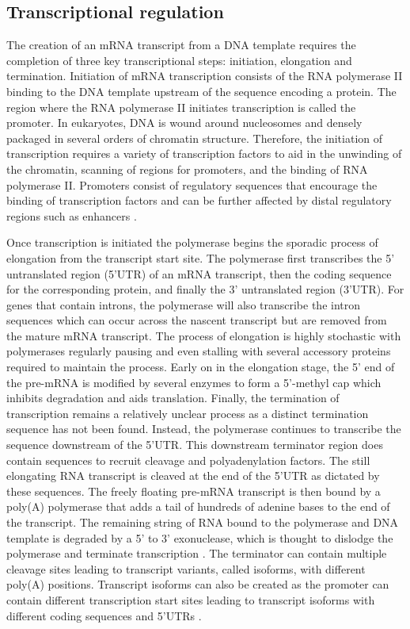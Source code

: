 \documentclass[../main.tex]{subfiles}
\begin{document}
\subsection{Transcriptional regulation}

The creation of an mRNA transcript from a DNA template requires the completion of three key transcriptional steps: initiation, elongation and termination.
Initiation of mRNA transcription consists of the RNA polymerase II binding to the DNA template upstream of the sequence encoding a protein.
The region where the RNA polymerase II initiates transcription is called the promoter.
In eukaryotes, DNA is wound around nucleosomes and densely packaged in several orders of chromatin structure.
Therefore, the initiation of transcription requires a variety of transcription factors to aid in the unwinding of the chromatin, scanning of regions for promoters, and the binding of RNA polymerase II.
Promoters consist of regulatory sequences that encourage the binding of transcription factors and can be further affected by distal regulatory regions such as enhancers \parencite{Cramer2019}. 

Once transcription is initiated the polymerase begins the sporadic process of elongation from the transcript start site.
The polymerase first transcribes the 5' untranslated region (5'UTR) of an mRNA transcript, then the coding sequence for the corresponding protein, and finally the 3' untranslated region (3'UTR).
For genes that contain introns, the polymerase will also transcribe the intron sequences which can occur across the nascent transcript but are removed from the mature mRNA transcript.  
The process of elongation is highly stochastic with polymerases regularly pausing and even stalling with several accessory proteins required to maintain the process.
Early on in the elongation stage, the 5' end of the pre-mRNA is modified by several enzymes to form a 5'-methyl cap which inhibits degradation and aids translation.
Finally, the termination of transcription remains a relatively unclear process as a distinct termination sequence has not been found.
Instead, the polymerase continues to transcribe the sequence downstream of the 5'UTR.
This downstream terminator region does contain sequences to recruit cleavage and polyadenylation factors.
The still elongating RNA transcript is cleaved at the end of the 5'UTR as dictated by these sequences.
The freely floating pre-mRNA transcript is then bound by a poly(A) polymerase that adds a tail of hundreds of adenine bases to the end of the transcript.
The remaining string of RNA bound to the polymerase and DNA template is degraded by a 5' to 3' exonuclease, which is thought to dislodge the polymerase and terminate transcription \parencite{Alberts2017,Cramer2019}.
The terminator can contain multiple cleavage sites leading to transcript variants, called isoforms, with different poly(A) positions.
Transcript isoforms can also be created as the promoter can contain different transcription start sites leading to transcript isoforms with different coding sequences and 5'UTRs \parencite{Klerk2015}.
\end{document}
